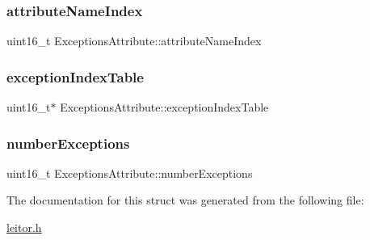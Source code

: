 \subsubsection{\texorpdfstring{attribute\+Name\+Index}{attributeNameIndex}}
{\footnotesize\ttfamily uint16\+\_\+t Exceptions\+Attribute\+::attribute\+Name\+Index}

\mbox{\label{structExceptionsAttribute_a6e7edf18fe9cf9f9cae4e4aed16d0837}} 
\subsubsection{\texorpdfstring{exception\+Index\+Table}{exceptionIndexTable}}
{\footnotesize\ttfamily uint16\+\_\+t$\ast$ Exceptions\+Attribute\+::exception\+Index\+Table}

\mbox{\label{structExceptionsAttribute_ae877887aa7835d6a65b2a9dcf313e849}} 
\subsubsection{\texorpdfstring{number\+Exceptions}{numberExceptions}}
{\footnotesize\ttfamily uint16\+\_\+t Exceptions\+Attribute\+::number\+Exceptions}



The documentation for this struct was generated from the following file\+:\begin{DoxyCompactItemize}
\item 
\hyperlink{leitor_8h}{leitor.\+h}\end{DoxyCompactItemize}
